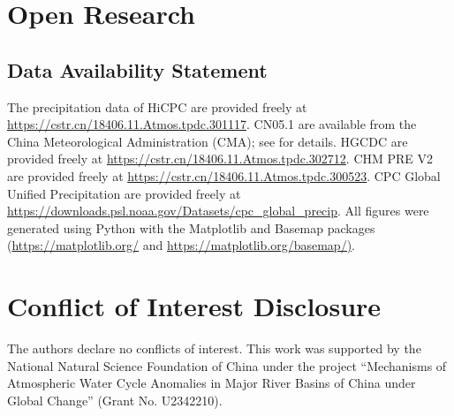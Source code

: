 \documentclass[draft]{agujournal2019}
\begin{document}
\section*{Open Research}

\subsection*{Data Availability Statement}

The precipitation data of HiCPC are provided freely at \url{https://cstr.cn/18406.11.Atmos.tpdc.301117}. CN05.1 are available from the China Meteorological Administration (CMA); see \cite{wu_changes_2017} for details. HGCDC are provided freely at \url{https://cstr.cn/18406.11.Atmos.tpdc.302712}. CHM PRE V2 are provided freely at \url{https://cstr.cn/18406.11.Atmos.tpdc.300523}. CPC Global Unified Precipitation are provided freely at \url{https://downloads.psl.noaa.gov/Datasets/cpc_global_precip}. All figures were generated using Python with the Matplotlib and Basemap packages (\url{https://matplotlib.org/} and \url{https://matplotlib.org/basemap/)}.

\section*{Conflict of Interest Disclosure}
The authors declare no conflicts of interest.
\acknowledgments
This work was supported by the National Natural Science Foundation of China under the project ``Mechanisms of Atmospheric Water Cycle Anomalies in Major River Basins of China under Global Change'' (Grant No. U2342210).
\clearpage

\end{document}
